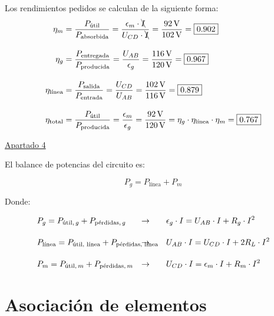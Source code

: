 \begin{example}
\vspace{5mm}

Los rendimientos pedidos se calculan de la siguiente forma:
\begin{align*}
    \eta_m &= \frac{P_{\textrm{útil}}}{P_{\textrm{absorbida}}} = \frac{\epsilon_m \cdot \bcancel{I}}{U_{CD} \cdot \bcancel{I}} = \frac{\qty{92}{\volt}}{\qty{102}{\volt}}  = \boxed{0.902}\\[10pt]
    \eta_g &= \frac{P_{\textrm{entregada}}}{P_{\textrm{producida}}} = \frac{U_{AB}}{\epsilon_g} = \frac{\qty{116}{\volt}}{\qty{120}{\volt}} = \boxed{0.967}\\[10pt]
    \eta_{\textrm{línea}} &= \frac{P_{\textrm{salida}}}{P_{\textrm{entrada}}} = \frac{U_{CD}}{U_{AB}} = \frac{\qty{102}{\volt}}{\qty{116}{\volt}} = \boxed{0.879}\\[10pt]
    \eta_{\textrm{total}} &= \frac{P_{\textrm{útil}}}{P_{\textrm{producida}}} = \frac{\epsilon_m}{\epsilon_g} = \frac{\qty{92}{\volt}}{\qty{120}{\volt}} = \eta_g \cdot \eta_{\textrm{línea}} \cdot \eta_m = \boxed{0.767}
\end{align*}

\vspace{2mm}

\underline{Apartado 4}

\vspace{5mm}

El balance de potencias del circuito es:

\[
  P_{g} = P_{\textrm{línea}} + P_{m}
\]

Donde:

\vspace{-3mm}
\begin{align*}
  & P_{g} = P_{\textrm{útil}, \, g} + P_{\textrm{pérdidas}, \, g} & \rightarrow \qquad & \epsilon_g \cdot I = U_{AB} \cdot I + R_g \cdot I^2 \\[10pt]
  & P_{\textrm{línea}} = P_{\textrm{útil, línea}} + P_{\textrm{pérdidas, línea}} \hspace{-20mm} & \rightarrow \qquad & U_{AB} \cdot I = U_{CD} \cdot I + 2 R_L \cdot I^2\\[10pt]
  & P_{m} = P_{\textrm{útil}, \, m} + P_{\textrm{pérdidas}, \, m} & \rightarrow \qquad & U_{CD} \cdot I = \epsilon_m \cdot I + R_m \cdot I^2 
\end{align*}
	    
\end{example}
	
	\section{Asociación de elementos}
	
